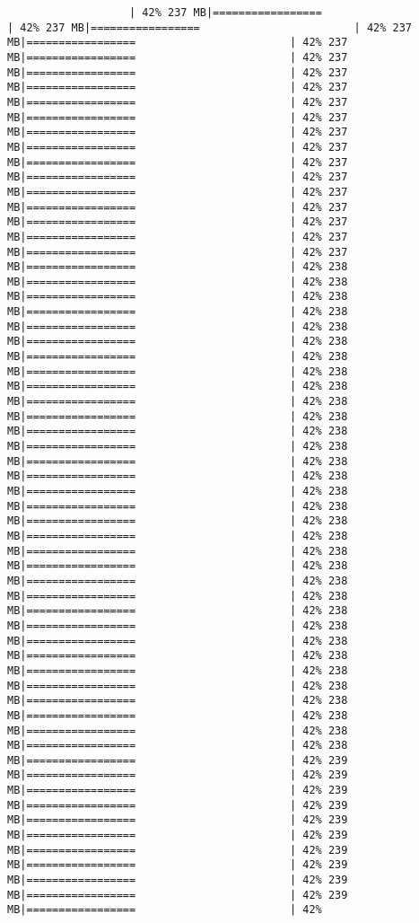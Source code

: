 \documentclass[
]{article}
\begin{document}
\begin{verbatim}
                   | 42% 237 MB|=================                        | 42% 237 MB|=================                        | 42% 237 MB|=================                        | 42% 237 MB|=================                        | 42% 237 MB|=================                        | 42% 237 MB|=================                        | 42% 237 MB|=================                        | 42% 237 MB|=================                        | 42% 237 MB|=================                        | 42% 237 MB|=================                        | 42% 237 MB|=================                        | 42% 237 MB|=================                        | 42% 237 MB|=================                        | 42% 237 MB|=================                        | 42% 237 MB|=================                        | 42% 237 MB|=================                        | 42% 237 MB|=================                        | 42% 237 MB|=================                        | 42% 238 MB|=================                        | 42% 238 MB|=================                        | 42% 238 MB|=================                        | 42% 238 MB|=================                        | 42% 238 MB|=================                        | 42% 238 MB|=================                        | 42% 238 MB|=================                        | 42% 238 MB|=================                        | 42% 238 MB|=================                        | 42% 238 MB|=================                        | 42% 238 MB|=================                        | 42% 238 MB|=================                        | 42% 238 MB|=================                        | 42% 238 MB|=================                        | 42% 238 MB|=================                        | 42% 238 MB|=================                        | 42% 238 MB|=================                        | 42% 238 MB|=================                        | 42% 238 MB|=================                        | 42% 238 MB|=================                        | 42% 238 MB|=================                        | 42% 238 MB|=================                        | 42% 238 MB|=================                        | 42% 238 MB|=================                        | 42% 238 MB|=================                        | 42% 238 MB|=================                        | 42% 238 MB|=================                        | 42% 238 MB|=================                        | 42% 238 MB|=================                        | 42% 238 MB|=================                        | 42% 238 MB|=================                        | 42% 238 MB|=================                        | 42% 238 MB|=================                        | 42% 239 MB|=================                        | 42% 239 MB|=================                        | 42% 239 MB|=================                        | 42% 239 MB|=================                        | 42% 239 MB|=================                        | 42% 239 MB|=================                        | 42% 239 MB|=================                        | 42% 239 MB|=================                        | 42% 239 MB|=================                        | 42% 239 MB|=================                        | 42% 
\end{verbatim}
\end{document}
